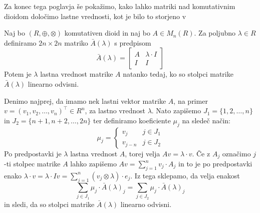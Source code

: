 \documentclass[mat1]{fmfdelo}
\begin{document}
Za konec tega poglavja še pokažimo, kako lahko matriki nad komutativnim dioidom določimo lastne vrednosti, kot je bilo to storjeno v \cite[poglajve 6, izrek 6]{bib:Gondran}

\begin{izrek}
Naj bo $(R, \oplus, \otimes)$ komutativen dioid in naj bo $A\in M_n(R)$. Za poljubno $\lambda \in R$ definiramo $2n\times 2n$ matriko $\bar{A}(\lambda)$ s predpisom $$\bar{A}(\lambda) = \begin{bmatrix}
	A & \lambda\cdot I \\
	I & I
\end{bmatrix}$$
Potem je $\lambda$ lastna vrednost matrike $A$ natanko tedaj, ko so stolpci matrike $\bar{A}(\lambda)$ linearno odvisni.
\end{izrek}
\begin{dokaz}
	Denimo najprej, da imamo nek lastni vektor matrike $A$, na primer $v = (v_1, v_2, \ldots, v_n)^\top\in R^n$, za lastno vrednost $\lambda$. Nato zapišemo $J_1 = \{1, 2, \ldots, n\}$ in $J_2 = \{n+1, n+2, \ldots, 2n\}$ ter definiramo koeficiente $\mu_j$ na sledeč način: $$\mu_j = \begin{cases}
		v_j & j\in J_1 \\
		v_{j-n} & j\in J_2
	\end{cases}$$
	Po predpostavki je $\lambda$ lastna vrednost $A$, torej velja $Av = \lambda\cdot v$. Če z $A_j$ označimo $j$-ti stolpec matrike $A$ lahko zapišemo $Av = \sum_{j = 1}^{n} v_j \cdot A_j$ in to je po predpostavki enako $\lambda\cdot v = \lambda \cdot Iv = \sum_{j = 1}^{n}(v_j \otimes \lambda ) \cdot e_j$. Iz tega sklepamo, da velja enakost \begin{equation} \label{eq:eigendep}
		\sum_{j\in J_1}\mu_j \cdot \bar{A}(\lambda)_j = \sum_{j\in J_2}\mu_j \cdot \bar{A}(\lambda)_j
	\end{equation} in sledi, da so stolpci matrike $\bar{A}(\lambda)$ linearno odvisni.
	

\end{dokaz}
\end{document}

